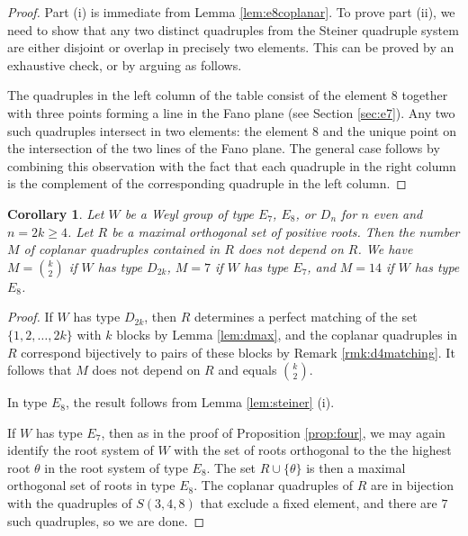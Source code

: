 \documentclass[11pt]{amsart}
\theoremstyle{plain}
\newtheorem{cor}[theorem]{Corollary}
\theoremstyle{definition}
\theoremstyle{remark}
\numberwithin{equation}{subsection}
\newcommand{\be}{\beta}
\newcommand{\coplanar}{coplanar\xspace}
\begin{document}
\begin{proof}
Part (i) is immediate from Lemma \ref{lem:e8coplanar}.  To prove part (ii), we
need to show that any two distinct quadruples from the Steiner quadruple system
are either disjoint or overlap in precisely two elements. This can be proved by
an exhaustive check, or by arguing as follows.

The quadruples in the left column of the table consist of the element 8 together
with three points forming a line in the Fano plane (see Section \ref{sec:e7}).
Any two such quadruples intersect in two elements: the element 8 and the unique
point on the intersection of the two lines of the Fano plane. The general case
follows by combining this observation with the fact that each quadruple in the
right column is the complement of the corresponding quadruple in the left
column.
\end{proof}


\begin{cor}\label{cor:mcount}
Let $W$ be a Weyl group of type $E_7$, $E_8$, or $D_n$ for $n$ even and $n=2k\ge
4$. Let $R$ be a maximal orthogonal set of positive roots. Then the number $M$
of  \coplanar quadruples contained in $R$  does not depend on $R$. We have $M =
\binom{k}{2}$ if $W$ has type $D_{2k}$, $M = 7$ if $W$ has type $E_7$, and $M =
14$ if $W$ has type $E_8$. \end{cor}

\begin{proof}
If $W$ has type $D_{2k}$, then $R$ determines a perfect matching of the set
$\{1, 2, \ldots, 2k\}$ with $k$ blocks by Lemma \ref{lem:dmax}, and the
\coplanar quadruples in $R$ correspond bijectively to pairs of these blocks by
Remark \ref{rmk:d4matching}. It follows that $M$ does not depend on $R$ and
equals $\binom{k}{2}$.

In type $E_8$, the result follows from Lemma \ref{lem:steiner} (i).

If $W$ has type $E_7$, then as in the proof of Proposition \ref{prop:four}, we
may again identify the root system of $W$ with the set  of roots orthogonal to
the  the highest root $\theta$ in the root system of type $E_8$. The set $R \cup
\{\theta\}$ is then a maximal orthogonal set of roots in type $E_8$. The
\coplanar quadruples of $R$ are in bijection with the quadruples of $S(3,4,8)$
that exclude a fixed element, and there are $7$ such quadruples, so we are done.
\end{proof}
\end{document}
